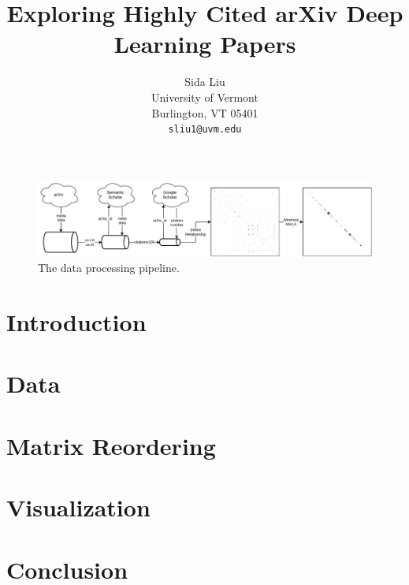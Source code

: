 \documentclass{article}
\title{Exploring Highly Cited arXiv Deep Learning Papers}
\author{
  Sida Liu \\
  University of Vermont\\
  Burlington, VT 05401\\
  \texttt{sliu1@uvm.edu} \\

}
\begin{document}
\maketitle

\begin{figure}[h]
  \centering
  \includegraphics[width=\textwidth]{images/fig1.pdf}
  \caption{The data processing pipeline.}
  \label{fig:1}
\end{figure}

\begin{abstract}

\end{abstract}



% 

\section{Introduction}


\section{Data}


\section{Matrix Reordering}


\section{Visualization}


\section{Conclusion}


  
\end{document}
